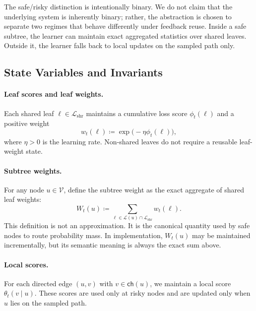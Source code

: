 \documentclass{article}
\begin{document}
The safe/risky distinction is intentionally binary. We do not claim that the underlying system is inherently binary; rather, the abstraction is chosen to separate two regimes that behave differently under feedback reuse. Inside a safe subtree, the learner can maintain exact aggregated statistics over shared leaves. Outside it, the learner falls back to local updates on the sampled path only.

\subsection{State Variables and Invariants}
\label{sec:barriershare_state}

\paragraph{Leaf scores and leaf weights.}
Each shared leaf $\ell \in \mathcal{L}_{\mathrm{shr}}$ maintains a cumulative loss score $\phi_t(\ell)$ and a positive weight
\begin{equation}
    w_t(\ell) \coloneqq \exp\!\bigl(-\eta \phi_t(\ell)\bigr),
    \label{eq:leaf_weight_def}
\end{equation}
where $\eta>0$ is the learning rate. Non-shared leaves do not require a reusable leaf-weight state.

\paragraph{Subtree weights.}
For any node $u \in \mathcal{V}$, define the subtree weight as the exact aggregate of shared leaf weights:
\begin{equation}
    W_t(u) \coloneqq \sum_{\ell \in \mathcal{L}(u)\cap \mathcal{L}_{\mathrm{shr}}} w_t(\ell).
    \label{eq:subtree_weight_def}
\end{equation}
This definition is not an approximation. It is the canonical quantity used by safe nodes to route probability mass. In implementation, $W_t(u)$ may be maintained incrementally, but its semantic meaning is always the exact sum above.

\paragraph{Local scores.}
For each directed edge $(u,v)$ with $v \in \mathsf{ch}(u)$, we maintain a local score $\theta_t(v\mid u)$. These scores are used only at risky nodes and are updated only when $u$ lies on the sampled path.
\end{document}
